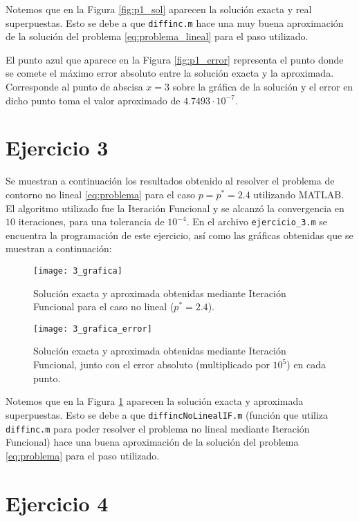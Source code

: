 \documentclass[11pt]{article}
\begin{document}
Notemos que en la Figura \ref{fig:p1_sol} aparecen la solución exacta y real superpuestas. Esto se debe a que \texttt{diffinc.m} hace una muy buena aproximación de la solución del problema \eqref{eq:problema_lineal} para el paso utilizado. 

El punto azul que aparece en la Figura \ref{fig:p1_error} representa el punto donde se comete el máximo error absoluto entre la solución exacta y la aproximada. Corresponde al punto de abscisa $x=3$ sobre la gráfica de la solución y el error en dicho punto toma el valor aproximado de $4.7493\cdot 10^{-7}$.

\section*{Ejercicio 3}

Se muestran a continuación los resultados obtenido al resolver el problema de contorno no lineal \eqref{eq:problema} para el caso $p=p^*=2.4$ utilizando MATLAB. El algoritmo utilizado fue la Iteración Funcional y se alcanzó la convergencia en $10$ iteraciones, para una tolerancia de $10^{-4}$. En el archivo \texttt{ejercicio\_3.m} se encuentra la programación de este ejercicio, así como las gráficas obtenidas que se muestran a continuación:

\begin{figure}[H]
\centering
\texttt{[image: 3\_grafica]}
\caption{Solución exacta y aproximada obtenidas mediante Iteración Funcional para el caso no lineal ($p^*=2.4$).}
\label{fig:nolin_sol}
\end{figure}
\begin{figure}[H]
\centering
\texttt{[image: 3\_grafica\_error]}
\caption{Solución exacta y aproximada obtenidas mediante Iteración Funcional, junto con el error absoluto (multiplicado por $10^5$) en cada punto.}
\label{fig:nolin_error}
\end{figure}

Notemos que en la Figura \ref{fig:nolin_sol} aparecen la solución exacta y aproximada superpuestas. Esto se debe a que \texttt{diffincNoLinealIF.m} (función que utiliza \texttt{diffinc.m} para poder resolver el problema no lineal mediante Iteración Funcional) hace una buena aproximación de la solución del problema \eqref{eq:problema} para el paso utilizado. 

\section*{Ejercicio 4}
\end{document}
